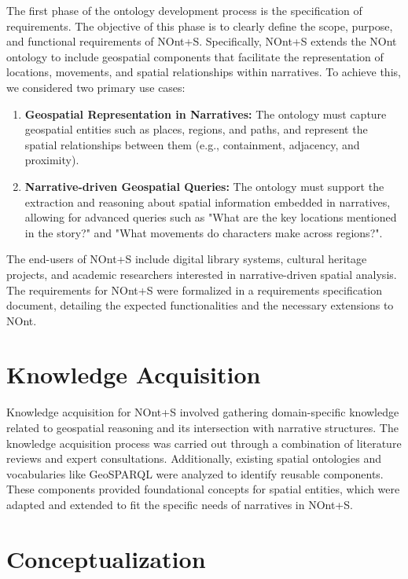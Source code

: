 The first phase of the ontology development process is the specification of requirements. The objective of this phase is to clearly define the scope, purpose, and functional requirements of NOnt+S. Specifically, NOnt+S extends the NOnt ontology to include geospatial components that facilitate the representation of locations, movements, and spatial relationships within narratives. To achieve this, we considered two primary use cases:

\begin{enumerate}
    \item \textbf{Geospatial Representation in Narratives:} The ontology must capture geospatial entities such as places, regions, and paths, and represent the spatial relationships between them (e.g., containment, adjacency, and proximity). 
    \item \textbf{Narrative-driven Geospatial Queries:} The ontology must support the extraction and reasoning about spatial information embedded in narratives, allowing for advanced queries such as "What are the key locations mentioned in the story?" and "What movements do characters make across regions?".
\end{enumerate}

The end-users of NOnt+S include digital library systems, cultural heritage projects, and academic researchers interested in narrative-driven spatial analysis. The requirements for NOnt+S were formalized in a requirements specification document, detailing the expected functionalities and the necessary extensions to NOnt. 

\section{Knowledge Acquisition}\label{IV-sec:knowledge-acquisition}

Knowledge acquisition for NOnt+S involved gathering domain-specific knowledge related to geospatial reasoning and its intersection with narrative structures. The knowledge acquisition process was carried out through a combination of literature reviews and expert consultations. Additionally, existing spatial ontologies and vocabularies like GeoSPARQL\cite{matthewperryOGCGeoSPARQLGeographic2012} were analyzed to identify reusable components. These components provided foundational concepts for spatial entities, which were adapted and extended to fit the specific needs of narratives in NOnt+S.


\section{Conceptualization}\label{IV-sec:conceptualization}

